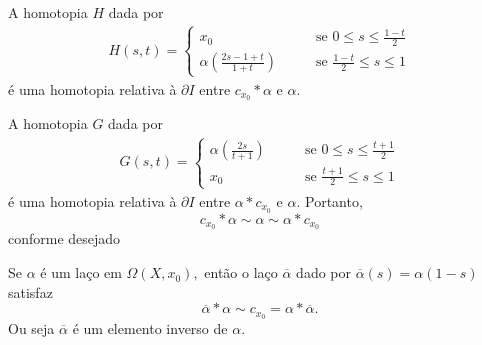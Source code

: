 \begin{dem}
    A homotopia $H$ dada por 
    \begin{align*}
        H(s,t)=\begin{cases}
            x_0\;\;\;&\;\;\;\mbox{ se }0\le s \le \frac{1-t}{2}\\
            \alpha(\frac{2s-1+t}{1+t}) \;\;\;&\;\;\;\mbox{ se }\frac{1-t}{2}\le s\le 1
        \end{cases}
    \end{align*}
    é uma homotopia relativa à $\partial I$ entre $c_{x_0}*\alpha$ e $\alpha.$
    
    A homotopia $G$ dada por 
    \begin{align*}
        G(s,t)=\begin{cases}
            \alpha(\frac{2s}{t+1})\;\;\;&\;\;\;\mbox{ se }0\le s \le \frac{t+1}{2}\\
            x_0\;\;\;&\;\;\;\mbox{ se }\frac{t+1}{2}\le s \le 1
        \end{cases}
    \end{align*}
    é uma homotopia relativa à $\partial I$ entre $\alpha*c_{x_0}$ e $\alpha.$ Portanto, $$c_{x_0}*\alpha\sim\alpha\sim\alpha*c_{x_0}$$ conforme desejado
\end{dem}

\begin{lemma}
    Se $\alpha$ é um laço em $\Omega(X,x_0),$ então o laço $\overline{\alpha}$ dado por $\overline{\alpha}(s)=\alpha(1-s)$ satisfaz 
    $$\overline{\alpha}*\alpha\sim c_{x_0}=\alpha*\overline{\alpha}.$$
    Ou seja $\overline{\alpha}$ é um elemento inverso de $\alpha.$
\end{lemma}

